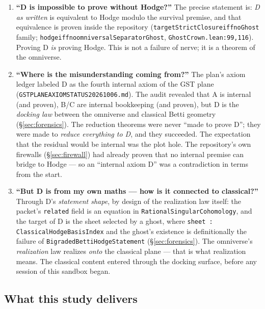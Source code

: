 \documentclass[11pt]{article}
\renewcommand{\_}{\textunderscore\allowbreak}
\begin{document}
\begin{enumerate}[leftmargin=2em]
\item \textbf{``D is impossible to prove without Hodge?''}
The precise statement is: \emph{D as written} is equivalent to Hodge modulo the
survival premise, and that equivalence is proven inside the repository
(\texttt{targetStrictClosure\_iff\_noGhost} family;
\texttt{hodge\_iff\_no\_omniversalSeparatorGhost},
\texttt{GhostCrown.lean:99,116}). Proving D \emph{is} proving Hodge. This is not
a failure of nerve; it is a theorem of the omniverse.
\item \textbf{``Where is the misunderstanding coming from?''}
The plan's axiom ledger labeled D as the fourth internal axiom of the GST plane
(\texttt{GST\_PLANE\_AXIOM\_STATUS\_20261006.md}). The audit revealed that A is
internal (and proven), B/C are internal bookkeeping (and proven), but D is the
\emph{docking law} between the omniverse and classical Betti geometry
(\S\ref{sec:forensics}). The reduction theorems were never ``made to prove D'';
they were made to \emph{reduce everything to D}, and they succeeded. The
expectation that the residual would be internal was the plot hole. The
repository's own firewalls (\S\ref{sec:firewall}) had already proven that no
internal premise can bridge to Hodge --- so an ``internal axiom D'' was a
contradiction in terms from the start.
\item \textbf{``But D is from my own maths --- how is it connected to classical?''}
Through D's \emph{statement shape}, by design of the realization law itself:
the packet's \texttt{related} field is an equation in
\texttt{RationalSingularCohomology}, and the target of D is the sheet selected
by a ghost, where \texttt{sheet : ClassicalHodgeBasisIndex} and the ghost's
existence is definitionally the failure of \texttt{BigradedBettiHodgeStatement}
(\S\ref{sec:forensics}). The omniverse's \emph{realization} law realizes
\emph{onto} the classical plane --- that is what realization means. The classical
content entered through the docking surface, before any session of this
sandbox began.
\end{enumerate}

\subsection{What this study delivers}
\end{document}
